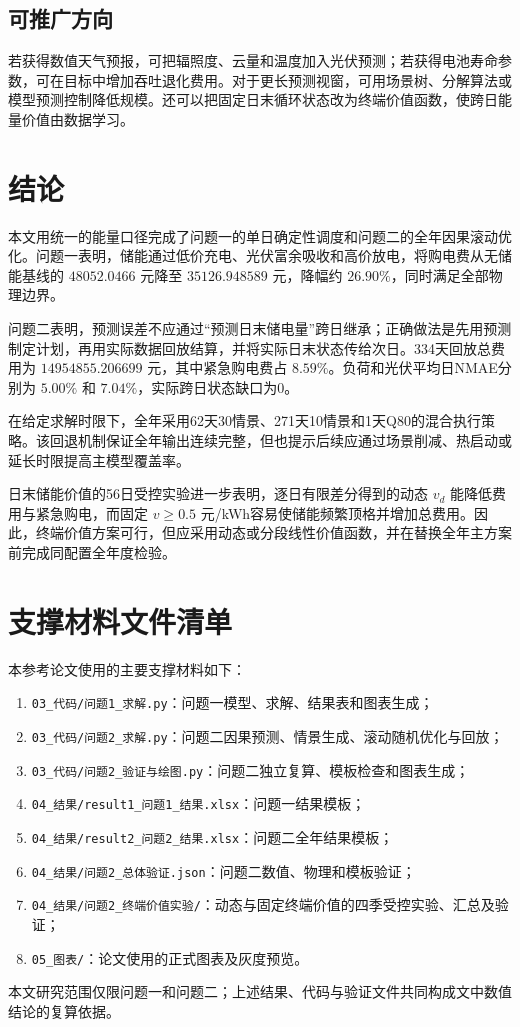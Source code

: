\documentclass[UTF8,12pt,a4paper]{ctexart}
\begin{document}
\subsection{可推广方向}

若获得数值天气预报，可把辐照度、云量和温度加入光伏预测；若获得电池寿命参数，可在目标中增加吞吐退化费用。对于更长预测视窗，可用场景树、分解算法或模型预测控制降低规模。还可以把固定日末循环状态改为终端价值函数，使跨日能量价值由数据学习。

\section{结论}

本文用统一的能量口径完成了问题一的单日确定性调度和问题二的全年因果滚动优化。问题一表明，储能通过低价充电、光伏富余吸收和高价放电，将购电费从无储能基线的 $48052.0466$ 元降至 $35126.948589$ 元，降幅约 $26.90\%$，同时满足全部物理边界。

问题二表明，预测误差不应通过“预测日末储电量”跨日继承；正确做法是先用预测制定计划，再用实际数据回放结算，并将实际日末状态传给次日。334天回放总费用为 $14954855.206699$ 元，其中紧急购电费占 $8.59\%$。负荷和光伏平均日NMAE分别为 $5.00\%$ 和 $7.04\%$，实际跨日状态缺口为0。

在给定求解时限下，全年采用62天30情景、271天10情景和1天Q80的混合执行策略。该回退机制保证全年输出连续完整，但也提示后续应通过场景削减、热启动或延长时限提高主模型覆盖率。

日末储能价值的56日受控实验进一步表明，逐日有限差分得到的动态 $v_d$ 能降低费用与紧急购电，而固定 $v\ge0.5$ 元/kWh容易使储能频繁顶格并增加总费用。因此，终端价值方案可行，但应采用动态或分段线性价值函数，并在替换全年主方案前完成同配置全年度检验。




\appendix
\section{支撑材料文件清单}

本参考论文使用的主要支撑材料如下：
\begin{enumerate}
  \item \texttt{03\_代码/问题1\_求解.py}：问题一模型、求解、结果表和图表生成；
  \item \texttt{03\_代码/问题2\_求解.py}：问题二因果预测、情景生成、滚动随机优化与回放；
  \item \texttt{03\_代码/问题2\_验证与绘图.py}：问题二独立复算、模板检查和图表生成；
  \item \texttt{04\_结果/result1\_问题1\_结果.xlsx}：问题一结果模板；
  \item \texttt{04\_结果/result2\_问题2\_结果.xlsx}：问题二全年结果模板；
  \item \texttt{04\_结果/问题2\_总体验证.json}：问题二数值、物理和模板验证；
  \item \texttt{04\_结果/问题2\_终端价值实验/}：动态与固定终端价值的四季受控实验、汇总及验证；
  \item \texttt{05\_图表/}：论文使用的正式图表及灰度预览。
\end{enumerate}

本文研究范围仅限问题一和问题二；上述结果、代码与验证文件共同构成文中数值结论的复算依据。
\end{document}
